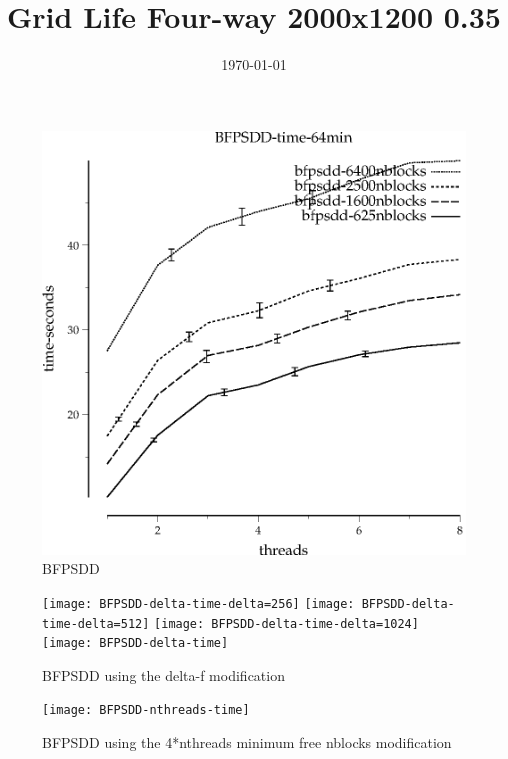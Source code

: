 \documentclass{article}
\title{Grid Life Four-way 2000x1200 0.35}
\date{\today}
\begin{document}
\maketitle

\begin{figure}
\begin{center}
\includegraphics{BFPSDD-time-64min}
\end{center}
\caption{BFPSDD}
\end{figure}

\begin{figure}
\begin{center}
\texttt{[image: BFPSDD-delta-time-delta=256]}
\texttt{[image: BFPSDD-delta-time-delta=512]}
\texttt{[image: BFPSDD-delta-time-delta=1024]}
\texttt{[image: BFPSDD-delta-time]}
\end{center}
\caption{BFPSDD using the delta-f modification}
\end{figure}

\begin{figure}
\begin{center}
\texttt{[image: BFPSDD-nthreads-time]}
\end{center}
\caption{BFPSDD using the 4*nthreads minimum free nblocks modification}
\end{figure}

\end{document}
